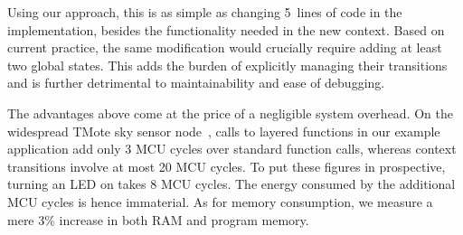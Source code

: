 Using our approach, this is as simple as changing 5~lines of code in
the \conesc implementation, besides the functionality needed in the
new  context.  Based on current practice, the same
modification would crucially require adding at least two global
states.  This adds the burden of explicitly managing their
transitions and is further detrimental to maintainability and ease
of debugging.

 The advantages above come at the price
of a negligible system overhead. On the widespread TMote sky sensor
node~\cite{}, calls to layered functions in our example application
add only 3 MCU cycles over standard function calls, whereas context
transitions involve at most 20 MCU cycles. To put these figures in
prospective, turning an LED on takes 8 MCU cycles. The energy consumed
by the additional MCU cycles is hence immaterial. As for memory
consumption, we measure a mere 3\% increase in both RAM and program
memory.





